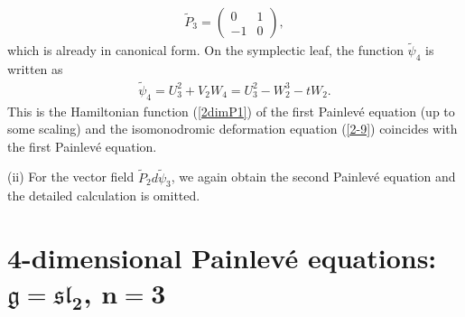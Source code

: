 \documentclass[10pt,a4paper]{amsart}
\numberwithin{equation}{section}
\begin{document}
\begin{gather*}
\widetilde{P}_3 = \left(
\begin{matrix}
0 & 1 \\
-1 & 0
\end{matrix}
\right),
\end{gather*}
which is already in canonical form. On the symplectic leaf, the function $\widetilde{\psi}_4$ is written as
\begin{gather*}
\widetilde{\psi}_4 = U_3^2 + V_2W_4 = U_3^2 - W_2^3 - tW_2.
\end{gather*}
This is the Hamiltonian function (\ref{2dimP1}) of the f\/irst Painlev\'{e} equation (up to some scaling) and the isomonodromic deformation equation (\ref{2-9}) coincides with the f\/irst Painlev\'{e} equation.

(ii) For the vector f\/ield $\widetilde{P}_2 d\widetilde{\psi}_3$, we again obtain the second Painlev\'{e} equation and the detailed calculation is omitted.

\section[4-dimensional Painlev\'{e} equations: $\mathfrak{g} = \mathfrak{sl}_2$, $n=3$]{4-dimensional Painlev\'{e} equations: $\boldsymbol{\mathfrak{g} = \mathfrak{sl}_2}$, $\boldsymbol{n=3}$}\label{section4}
\end{document}
